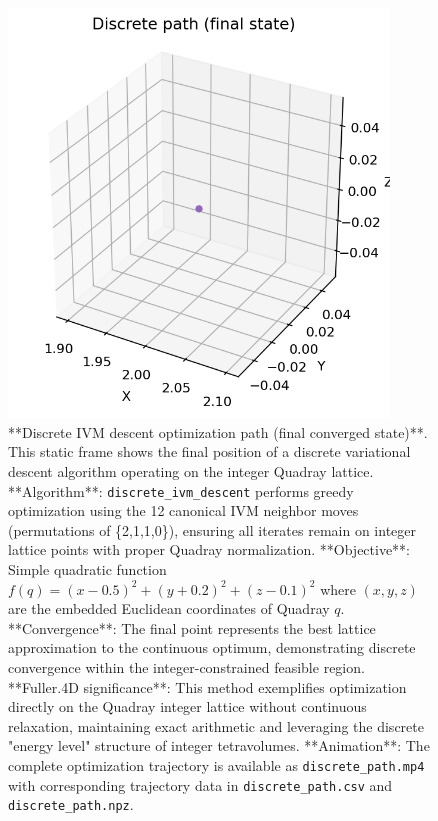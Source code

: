 \documentclass[
  10pt,
]{article}
\begin{document}
\begin{figure}[htbp]
\centering
\includegraphics[width=0.9\textwidth]{figures/discrete_path_final.png}
\caption{**Discrete IVM descent optimization path (final converged state)**. This static frame shows the final position of a discrete variational descent algorithm operating on the integer Quadray lattice. **Algorithm**: \texttt{discrete\_ivm\_descent} performs greedy optimization using the 12 canonical IVM neighbor moves (permutations of \{2,1,1,0\}), ensuring all iterates remain on integer lattice points with proper Quadray normalization. **Objective**: Simple quadratic function $f(q) = (x-0.5)^2 + (y+0.2)^2 + (z-0.1)^2$ where $(x,y,z)$ are the embedded Euclidean coordinates of Quadray $q$. **Convergence**: The final point represents the best lattice approximation to the continuous optimum, demonstrating discrete convergence within the integer-constrained feasible region. **Fuller.4D significance**: This method exemplifies optimization directly on the Quadray integer lattice without continuous relaxation, maintaining exact arithmetic and leveraging the discrete "energy level" structure of integer tetravolumes. **Animation**: The complete optimization trajectory is available as \texttt{discrete\_path.mp4} with corresponding trajectory data in \texttt{discrete\_path.csv} and \texttt{discrete\_path.npz}.}
\label{fig:discrete_path}
\end{figure}
\end{document}
